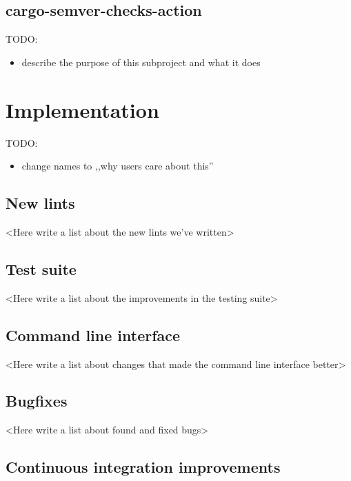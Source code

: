 \documentclass[licencjacka,en]{pracamgr}
\begin{document}
\section{cargo-semver-checks-action}

TODO:
\begin{itemize}
	\item describe the purpose of this subproject and what it does
\end{itemize}


\chapter{Implementation}\label{r:chapter_implementation}

TODO:
\begin{itemize}
	\item change names to ,,why users care about this''
\end{itemize}

\section{New lints}

<Here write a list about the new lints we've written>

\section{Test suite}

<Here write a list about the improvements in the testing suite>

\section{Command line interface}

<Here write a list about changes that made the command line interface better>

\section{Bugfixes}

<Here write a list about found and fixed bugs>

\section{Continuous integration improvements}
\end{document}
